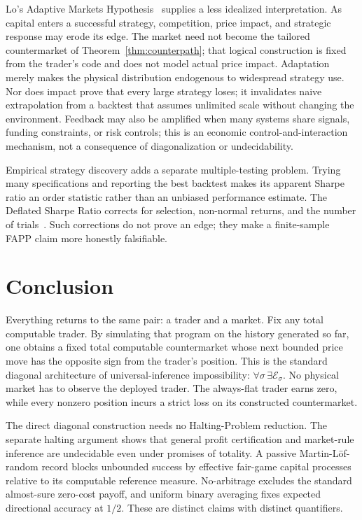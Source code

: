 \documentclass[aps,pra,reprint,superscriptaddress,amsmath,amssymb,floatfix]{revtex4-2}
\theoremstyle{plain}
\theoremstyle{definition}
\theoremstyle{remark}
\begin{document}
Lo's Adaptive Markets Hypothesis~\cite{Lo2004} supplies a less idealized
interpretation. As capital enters a successful strategy, competition, price
impact, and strategic response may erode its edge. The market need not become
the tailored countermarket of Theorem~\ref{thm:counterpath}; that logical
construction is fixed from the trader's code and does not model actual price
impact. Adaptation merely makes the physical distribution endogenous to
widespread strategy use. Nor does impact prove that every large strategy
loses; it invalidates naive extrapolation from a backtest that assumes
unlimited scale without changing the environment. Feedback may also be
amplified when many systems share signals, funding constraints, or risk
controls; this is an economic control-and-interaction mechanism, not a
consequence of diagonalization or undecidability.

Empirical strategy discovery adds a separate multiple-testing problem. Trying
many specifications and reporting the best backtest makes its apparent Sharpe
ratio an order statistic rather than an unbiased performance estimate. The
Deflated Sharpe Ratio corrects for selection, non-normal returns, and the
number of trials~\cite{BaileyLopez2014}. Such corrections do not prove an edge;
they make a finite-sample FAPP claim more honestly falsifiable.

\section{Conclusion}
\label{sec:conclusion}

Everything returns to the same pair: a trader and a market. Fix any total
computable trader. By simulating that program on the history generated so far,
one obtains a fixed total computable countermarket whose next bounded price
move has the opposite sign from the trader's position. This is the standard
diagonal architecture of universal-inference impossibility:
\(\forall\sigma\,\exists\mathcal E_\sigma\). No physical market has to observe
the deployed trader. The always-flat trader earns zero, while every nonzero
position incurs a strict loss on its constructed countermarket.

The direct diagonal construction needs no Halting-Problem reduction. The
separate halting argument shows that general profit certification and
market-rule inference are undecidable even under promises of totality. A
passive Martin-L\"of-random record blocks unbounded success by effective
fair-game capital processes relative to its computable reference measure.
No-arbitrage excludes the standard almost-sure zero-cost payoff, and uniform
binary averaging fixes expected directional accuracy at \(1/2\). These are
distinct claims with distinct quantifiers.
\end{document}
